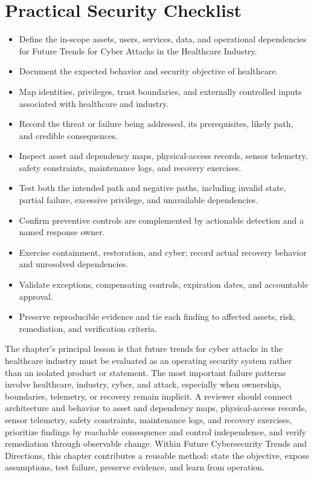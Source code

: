 \documentclass[11pt]{article}
\begin{document}
\section*{Practical Security Checklist}
\begin{itemize}[label=$\square$]
\item Define the in-scope assets, users, services, data, and operational dependencies for Future Trends for Cyber Attacks in the Healthcare Industry.
\item Document the expected behavior and security objective of healthcare.
\item Map identities, privileges, trust boundaries, and externally controlled inputs associated with healthcare and industry.
\item Record the threat or failure being addressed, its prerequisites, likely path, and credible consequences.
\item Inspect asset and dependency maps, physical-access records, sensor telemetry, safety constraints, maintenance logs, and recovery exercises.
\item Test both the intended path and negative paths, including invalid state, partial failure, excessive privilege, and unavailable dependencies.
\item Confirm preventive controls are complemented by actionable detection and a named response owner.
\item Exercise containment, restoration, and cyber; record actual recovery behavior and unresolved dependencies.
\item Validate exceptions, compensating controls, expiration dates, and accountable approval.
\item Preserve reproducible evidence and tie each finding to affected assets, risk, remediation, and verification criteria.
\end{itemize}
\begin{synthesisbox}
The chapter's principal lesson is that future trends for cyber attacks in the healthcare industry must be evaluated as an operating security system rather than an isolated product or statement. The most important failure patterns involve healthcare, industry, cyber, and attack, especially when ownership, boundaries, telemetry, or recovery remain implicit. A reviewer should connect architecture and behavior to asset and dependency maps, physical-access records, sensor telemetry, safety constraints, maintenance logs, and recovery exercises, prioritize findings by reachable consequence and control independence, and verify remediation through observable change. Within Future Cybersecurity Trends and Directions, this chapter contributes a reusable method: state the objective, expose assumptions, test failure, preserve evidence, and learn from operation.
\end{synthesisbox}
\end{document}
